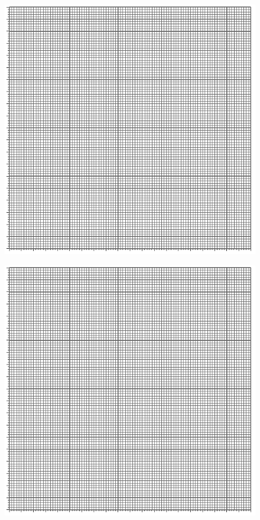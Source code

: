 \documentclass[UTF8]{article}
\begin{document}
\begin{figure}[H]\centering
\includegraphics[width=\columnwidth]{assets/100x100.pdf}
\end{figure}

\begin{figure}[H]\centering
\includegraphics[width=0.8\columnwidth]{assets/100x100.pdf}
\end{figure}
\end{document}
